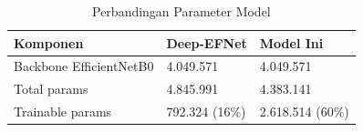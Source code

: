\begin{table}[H]
	\centering
	\caption{Perbandingan Parameter Model}
	\label{tab:param_compare}
	\begin{tabular}{|l|l|l|}
		\hline
		\textbf{Komponen} & \textbf{Deep-EFNet} & \textbf{Model Ini} \\ \hline
		Backbone EfficientNetB0 & 4.049.571 & 4.049.571 \\ \hline
		Total params & 4.845.991 & 4.383.141 \\ \hline
		Trainable params & 792.324 (16\%) & 2.618.514 (60\%) \\ \hline
	\end{tabular}
\end{table}